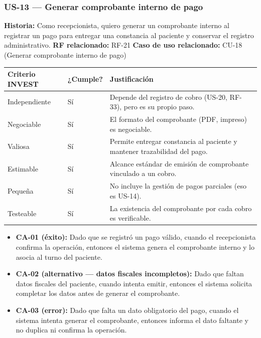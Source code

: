 \documentclass[11pt,a4paper]{article}
\providecommand{\tightlist}{%
	\setlength{\itemsep}{0pt}\setlength{\parskip}{0pt}}
\begin{document}
	\subsubsection{US-13 --- Generar comprobante interno de pago}
	
	\textbf{Historia:} Como recepcionista, quiero generar un comprobante interno al registrar un pago para entregar una constancia al paciente y conservar el registro administrativo.
	\textbf{RF relacionado:} RF-21
	\textbf{Caso de uso relacionado:} CU-18 (Generar comprobante interno de pago)
	
	\begin{longtable}{p{} p{} p{}}
		
		
		\toprule
		\textbf{Criterio INVEST} &
		\textbf{¿Cumple?} &
		\textbf{Justificación} \\
		\midrule
		\endhead
		
		Independiente & Sí & Depende del registro de cobro (US-20, RF-33), pero es su propio paso. \\
		Negociable & Sí & El formato del comprobante (PDF, impreso) es negociable. \\
		Valiosa & Sí & Permite entregar constancia al paciente y mantener trazabilidad del pago. \\
		Estimable & Sí & Alcance estándar de emisión de comprobante vinculado a un cobro. \\
		Pequeña & Sí & No incluye la gestión de pagos parciales (eso es US-14). \\
		Testeable & Sí & La existencia del comprobante por cada cobro es verificable. \\
		
		\bottomrule
	\end{longtable}
	
	\begin{itemize}
		\tightlist
		\item
		\textbf{CA-01 (éxito):} Dado que se registró un pago válido, cuando el recepcionista confirma la operación, entonces el sistema genera el comprobante interno y lo asocia al turno del paciente.
		\item
		\textbf{CA-02 (alternativo --- datos fiscales incompletos):} Dado que faltan datos fiscales del paciente, cuando intenta emitir, entonces el sistema solicita completar los datos antes de generar el comprobante.
		\item
		\textbf{CA-03 (error):} Dado que falta un dato obligatorio del pago, cuando el sistema intenta generar el comprobante, entonces informa el dato faltante y no duplica ni confirma la operación.
	\end{itemize}
	
\end{document}
